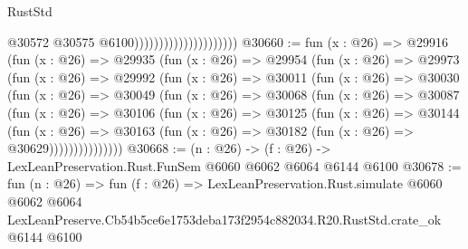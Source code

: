 \begin{lexlean}{RustStd}
\begin{coremodule}
                                              @30572
                                              @30575
                                              @6100)))))))))))))))))))))
@30660 := fun (x : @26) =>
  @29916
    (fun (x : @26) =>
    @29935
      (fun (x : @26) =>
      @29954
        (fun (x : @26) =>
        @29973
          (fun (x : @26) =>
          @29992
            (fun (x : @26) =>
            @30011
              (fun (x : @26) =>
              @30030
                (fun (x : @26) =>
                @30049
                  (fun (x : @26) =>
                  @30068
                    (fun (x : @26) =>
                    @30087
                      (fun (x : @26) =>
                      @30106
                        (fun (x : @26) =>
                        @30125
                          (fun (x : @26) =>
                          @30144
                            (fun (x : @26) =>
                            @30163 (fun (x : @26) => @30182 (fun (x : @26) => @30629)))))))))))))))
@30668 := (n : @26) -> (f : @26) -> LexLeanPreservation.Rust.FunSem @6060 @6062 @6064 @6144 @6100
@30678 := fun (n : @26) =>
  fun (f : @26) =>
  LexLeanPreservation.Rust.simulate
    @6060
    @6062
    @6064
    LexLeanPreserve.Cb54b5ce6e1753deba173f2954c882034.R20.RustStd.crate_ok
    @6144
    @6100
\end{coremodule}
\end{lexlean}
